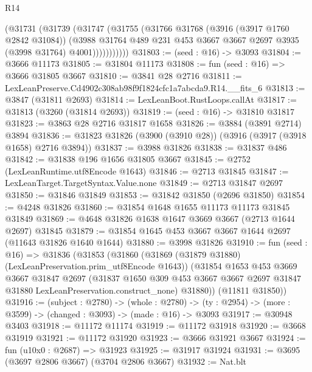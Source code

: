\begin{lexlean}{R14}
\begin{coremodule}
              (@31731
                (@31739
                  (@31747
                    (@31755
                      (@31766
                        @31768
                        (@3916 (@3917 @1760 @2842 @31084))
                        (@3988
                          @31764
                          @489
                          @231
                          @453
                          @3667
                          @3667
                          @2697
                          @3935
                          (@3998 @31764)
                          @4001)))))))))))
@31803 := (seed : @16) -> @3093
@31804 := @3666 @11173
@31805 := @31804 @11173
@31808 := fun (seed : @16) => @3666 @31805 @3667
@31810 := @3841 @28 @2716
@31811 := LexLeanPreserve.Cd4902c308ab98f9f1824cfc1a7abcda9.R14.__fits_6
@31813 := @3847 (@31811 @2693)
@31814 := LexLeanBoot.RustLoops.callAt
@31817 := @31813 (@3260 (@31814 @2693))
@31819 := (seed : @16) -> @31810 @31817
@31823 := @3863 @28 @2716 @31817 @1658
@31826 := @3884 (@3891 @2714) @3894
@31836 := @31823 @31826 (@3900 (@3910 @28)) (@3916 (@3917 (@3918 @1658) @2716 @3894))
@31837 := @3988 @31826
@31838 := @31837 @486
@31842 := @31838 @196 @1656 @31805 @3667
@31845 := @2752 (LexLeanRuntime.utf8Encode @1643)
@31846 := @2713 @31845
@31847 := LexLeanTarget.TargetSyntax.Value.none
@31849 := @2713 @31847 @2697
@31850 := @31846 @31849
@31853 := @31842 @31850 (@2696 @31850)
@31854 := @4248 @31826
@31860 := @31854 @1648 @1655 @11173 @11173 @31845 @31849
@31869 := @4648 @31826 @1638 @1647 @3669 @3667 (@2713 @1644 @2697) @31845
@31879 := @31854 @1645 @453 @3667 @3667 @1644 @2697 (@11643 @31826 @1640 @1644)
@31880 := @3998 @31826
@31910 := fun (seed : @16) =>
  @31836
    (@31853
      (@31860
        (@31869 (@31879 @31880) (LexLeanPreservation.prim_utf8Encode @1643))
        (@31854
          @1653
          @453
          @3669
          @3667
          @31847
          @2697
          (@31837
            @1650
            @309
            @453
            @3667
            @3667
            @2697
            @31847
            @31880
            LexLeanPreservation.construct_none)
          @31880))
      (@11811 @31850))
@31916 := (subject : @2780) ->
  (whole : @2780) -> (ty : @2954) -> (more : @3599) -> (changed : @3093) -> (made : @16) -> @3093
@31917 := @30948 @3403
@31918 := @11172 @11174
@31919 := @11172 @31918
@31920 := @3668 @31919
@31921 := @11172 @31920
@31923 := @3666 @31921 @3667
@31924 := fun (u10x0 : @2687) => @31923
@31925 := @31917 @31924
@31931 := @3695 (@3697 @2806 @3667) (@3704 @2806 @3667)
@31932 := Nat.blt

\end{coremodule}
\end{lexlean}
